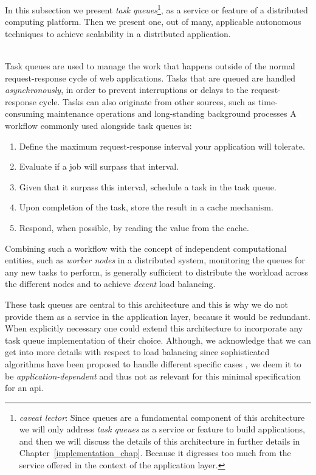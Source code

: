 \documentclass[12pt, titlepage]{uo_temp}
\begin{document}
     In this subsection we present \emph{task queues}\footnote{\emph{caveat lector}: Since
       queues are a fundamental component of this architecture we will only address
       \emph{task queues} as a service or feature to build applications, and then we will
       discuss the details of this architecture in further details in
       Chapter~\ref{implementation_chap}. Because it digresses too much from the service
       offered in the context of the application layer.}, as a service or feature of a
     distributed computing platform. Then we present one, out of many, applicable
     autonomous techniques to achieve scalability in a distributed application.

     \\ Task queues are used to manage the work that happens outside of the normal
     request-response cycle of web applications. Tasks that are queued are handled
     \emph{asynchronously}, in order to prevent interruptions or delays to the
     request-response cycle. Tasks can also originate from other sources, such as
     time-consuming maintenance operations and long-standing background processes A
     workflow commonly used alongside task queues is:
     \begin{enumerate}
     \item Define the maximum request-response interval your application will tolerate.
     \item Evaluate if a job will surpass that interval.
     \item Given that it surpass this interval, schedule a task in the task queue.
     \item Upon completion of the task, store the result in a cache mechanism.
     \item Respond, when possible, by reading the value from the cache.
     \end{enumerate}

     Combining such a workflow with the concept of independent computational entities,
     such as \emph{worker nodes} in a distributed system, monitoring the queues for
     any new tasks to perform, is generally sufficient to distribute the workload across
     the different nodes and to achieve \emph{decent} load balancing.

     These task queues are central to this architecture and this is why we do not provide
     them as a service in the application layer, because it would be redundant. When
     explicitly necessary one could extend this architecture to incorporate any task queue
     implementation of their choice. Although, we acknowledge that we can get into more
     details with respect to load balancing since sophisticated algorithms have been
     proposed to handle different specific cases \cite{antoine2014generic}
     \cite{kansal2012existing}, we deem it to be \emph{application-dependent} and thus not
     as relevant for this minimal specification for an \gls{api}.
\end{document}
